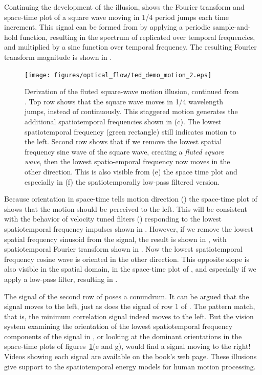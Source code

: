 Continuing the development of the illusion,  shows the Fourier transform and space-time plot of a square wave moving in 1/4 period jumps each time increment.  This signal can be formed from  by applying a periodic sample-and-hold function, resulting in the spectrum of   replicated over temporal frequencies, and multiplied by a sinc function over temporal frequency.  The resulting Fourier transform magnitude is shown in .


\begin{figure}[t]
    \texttt{[image: figures/optical\_flow/ted\_demo\_motion\_2.eps]}
    \caption{Derivation of the fluted square-wave motion illusion, continued from \fig{\ref{fig:motionIllusion1}}. Top row shows that the square wave moves in 1/4 wavelength jumps, instead of continuously. This staggered motion generates the additional spatiotemporal frequencies shown in (c).  The lowest spatiotemporal frequency (green rectangle) still indicates motion to the left.  Second row shows that if we remove the lowest spatial frequency sine wave of the square wave, creating a {\em fluted square wave}, then the lowest spatio-emporal frequency now moves in the other direction.  This is also visible from (e) the space time plot and especially in (f) the spatiotemporally low-pass filtered version.}
    \label{fig:motionIllusion2}
\end{figure}

Because orientation in space-time tells motion direction (\sect{\ref{sect:modelingSequences}}) the space-time plot of  shows that the motion should be perceived to the left.  This will be consistent with the behavior of velocity tuned filters (\sect{\ref{sect:velocityTunedFilters}}) responding to the lowest spatiotemporal frequency impulses shown in
. However, if we remove the lowest spatial frequency sinusoid from the signal, the result is shown in
, with spatiotemporal Fourier transform shown in .  Now the lowest spatiotemporal frequency cosine wave is oriented in the other direction.  This opposite slope is also visible in the spatial domain, in the space-time plot of , and especially if we apply a low-pass filter, resulting in .

The signal of the second row of \fig{\ref{fig:motionIllusion2}} poses a conundrum.  It can be argued that the signal moves to the left, just as does the signal of row 1 of \fig{\ref{fig:motionIllusion2}}.  The pattern match, that is, the minimum correlation signal indeed moves to the left.  But the vision system examining the orientation of the lowest spatiotemporal frequency components of the signal in , or looking at the dominant orientations in the space-time plots of figures~\ref{fig:motionIllusion2}(e and g), would find a signal moving to the right!  Videos showing each signal are available on the book's web page.  These illusions give support to the spatiotemporal energy models for human motion processing.

